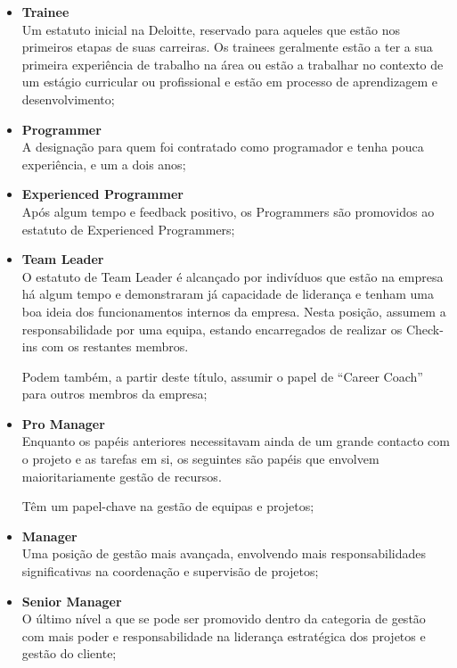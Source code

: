             \begin{itemize}
                \item \textbf{Trainee} \\
                    Um estatuto inicial na Deloitte, reservado para aqueles que estão nos primeiros etapas de suas carreiras. Os trainees geralmente estão a ter a sua primeira experiência de trabalho na área ou estão a trabalhar no contexto de um estágio curricular ou profissional e estão em processo de aprendizagem e desenvolvimento;
                \item \textbf{Programmer} \\
                    A designação para quem foi contratado como programador e tenha pouca experiência, e um a dois anos;
                \item \textbf{Experienced Programmer} \\
                    Após algum tempo e feedback positivo, os Programmers são promovidos ao estatuto de Experienced Programmers;
                \item \textbf{Team Leader} \\
                    O estatuto de Team Leader é alcançado por indivíduos que estão na empresa há algum tempo e demonstraram já capacidade de liderança e tenham uma boa ideia dos funcionamentos internos da empresa. Nesta posição, assumem a responsabilidade por uma equipa, estando encarregados de realizar os Check-ins com os restantes membros.
                    
                    Podem também, a partir deste título, assumir o papel de ``Career Coach'' para outros membros da empresa;
                \item \textbf{Pro Manager} \\
                    Enquanto os papéis anteriores necessitavam ainda de um grande contacto com o projeto e as tarefas em si, os seguintes são papéis que envolvem maioritariamente gestão de recursos.
                    
                    Têm um papel-chave na gestão de equipas e projetos;
                \item \textbf{Manager} \\
                    Uma posição de gestão mais avançada, envolvendo mais responsabilidades significativas na coordenação e supervisão de projetos;
                \item \textbf{Senior Manager} \\
                    O último nível a que se pode ser promovido dentro da categoria de gestão com mais poder e responsabilidade na liderança estratégica dos projetos e gestão do cliente;


\end{itemize}
